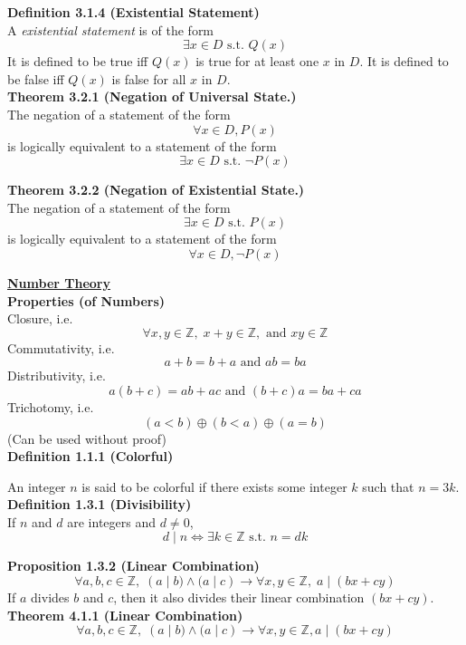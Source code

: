 \documentclass[a4paper]{article}
\newcommand{\heading}[1]{{\small\underline{\textbf{#1}}}}
\newcommand{\subheading}[1]{{\scriptsize\textbf{#1}}}
\newcommand\divides{\;|\;}
\begin{document}
\begin{multicols*}{4}
\subheading{Definition 3.1.4 (Existential Statement)}\\
A \textit{existential statement} is of the form $$\exists x \in D \text{ s.t. }
Q(x)$$ It is defined to be true iff $Q(x)$ is true for at least one $x$ in $D$.
It is defined to be false iff $Q(x)$ is false for all $x$ in $D$.\\

\subheading{Theorem 3.2.1 (Negation of Universal State.)}\\
The negation of a statement of the form $$\forall x \in D, P(x)$$ is logically
equivalent to a statement of the form $$\exists x \in D \text{ s.t. } \neg
P(x)$$

\subheading{Theorem 3.2.2 (Negation of Existential State.)}\\
The negation of a statement of the form $$\exists x \in D \text{ s.t. } P(x)$$
is logically equivalent to a statement of the form $$\forall x \in D, \neg
P(x)$$

\heading{Number Theory} \\

\subheading{Properties (of Numbers)} \\
Closure, i.e.
$$\forall x, y \in \mathbb{Z},\;
         x + y \in \mathbb{Z},\text{ and }
            xy \in \mathbb{Z}$$
Commutativity, i.e.
  $$a+b=b+a\text{ and }ab=ba$$
Distributivity, i.e.
  $$a(b+c) = ab + ac \text{ and } (b+c)a = ba + ca$$
Trichotomy, i.e.
  $$(a < b) \oplus (b < a) \oplus (a = b)$$
(Can be used without proof)\\

\subheading{Definition 1.1.1 (Colorful)}

An integer $n$ is said to be colorful if there exists some integer $k$ such
that $n = 3k$.\\

\subheading{Definition 1.3.1 (Divisibility)}\\
If $n$ and $d$ are integers and $d \neq 0$,
  $$ d \divides n \iff \exists k \in \mathbb{Z} \text{ s.t. } n=dk $$

\subheading{Proposition 1.3.2 (Linear Combination)}
$$\forall a, b, c \in \mathbb{Z},\;
(a \divides b) \land (a \divides c) \rightarrow
    \forall x, y \in \mathbb{Z},\;
    a \divides (bx + cy)$$
If $a$ divides $b$ and $c$, then it also divides their linear combination
$(bx + cy)$.\\

\subheading{Theorem 4.1.1 (Linear Combination)}\\
$$\forall a,b,c \in \mathbb{Z},\;
(a \divides b) \land (a \divides c)
    \rightarrow \forall x,y \in \mathbb{Z}, a \divides (bx + cy)$$


\end{multicols*}
\end{document}
